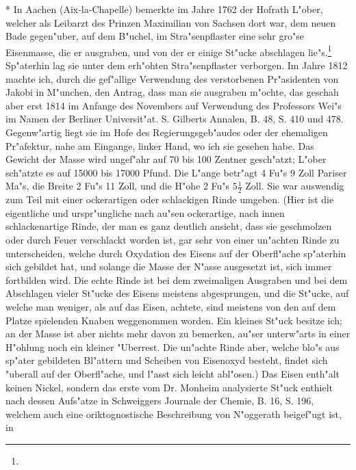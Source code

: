 \documentclass[a4paper, 11pt, oneside, polutonikogreek, german]{article}
\begin{document}
* In Aachen (Aix-la-Chapelle) bemerkte im Jahre 1762 der Hofrath L"ober, welcher als Leibarzt des Prinzen Maximilian von Sachsen dort war, dem neuen Bade gegen"uber, auf dem B"uchel, im Stra"senpflaster eine sehr gro"se Eisenmasse, die er ausgraben, und von der er einige St"ucke abschlagen lie"s.\footnote{} Sp"aterhin lag sie unter dem erh"ohten Stra"senpflaster verborgen. Im Jahre 1812 machte ich, durch die gef"allige Verwendung des verstorbenen Pr"asidenten von Jakobi in M"unchen, den Antrag, dass man sie ausgraben m"ochte, das geschah aber erst 1814 im Anfange des Novembers auf Verwendung des Professors Wei"s im Namen der Berliner Universit"at. S. Gilberts Annalen, B. 48, S. 410 und 478. Gegenw"artig liegt sie im Hofe des Regierungsgeb"audes oder der ehemaligen Pr"afektur, nahe am Eingange, linker Hand, wo ich sie gesehen habe. Das Gewicht der Masse wird ungef"ahr auf 70 bis 100 Zentner gesch"atzt; L"ober sch"atzte es auf 15000 bis 17000 Pfund. Die L"ange betr"agt 4 Fu"s 9 Zoll Pariser Ma"s, die Breite 2 Fu"s 11 Zoll, und die H"ohe 2 Fu"s $\mathfrak{5\frac{1}{2}}$ Zoll. Sie war auswendig zum Teil mit einer ockerartigen oder schlackigen Rinde umgeben. (Hier ist die eigentliche und urspr"ungliche nach au"sen ockerartige, nach innen schlackenartige Rinde, der man es ganz deutlich ansieht, dass sie geschmolzen oder durch Feuer verschlackt worden ist, gar sehr von einer un"achten Rinde zu unterscheiden, welche durch Oxydation des Eisens auf der Oberfl"ache sp"aterhin sich gebildet hat, und solange die Masse der N"asse ausgesetzt ist, sich immer fortbilden wird. Die echte Rinde ist bei dem zweimaligen Ausgraben und bei dem Abschlagen vieler St"ucke des Eisens meistens abgesprungen, und die St"ucke, auf welche man weniger, als auf das Eisen, achtete, sind meistens von den auf dem Platze spielenden Knaben weggenommen worden. Ein kleines St"uck besitze ich; an der Masse ist aber nichts mehr davon zu bemerken, au"ser unterw"arts in einer H"ohlung noch ein kleiner "Uberrest. Die un"achte Rinde aber, welche blo"s aus sp"ater gebildeten Bl"attern und Scheiben von Eisenoxyd besteht, findet sich "uberall auf der Oberfl"ache, und l"asst sich leicht abl"osen.) Das Eisen enth"alt keinen Nickel, sondern das erste vom Dr. Monheim analysierte St"uck enthielt nach dessen Aufs"atze in Schweiggers Journale der Chemie, B. 16, S. 196, welchem auch eine oriktognostische Beschreibung von N"oggerath beigef"ugt ist, in 
\end{document}
